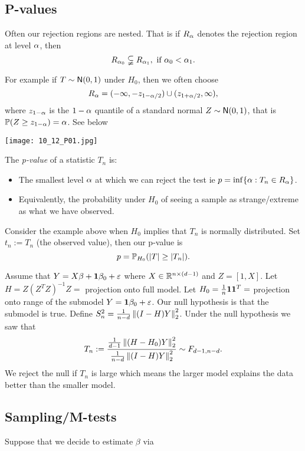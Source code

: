 \subsection{P-values}
Often our rejection regions are nested. That is if $R_{{\alpha}}$ denotes the rejection region at level ${\alpha}$, then 
\[R_{{\alpha}_0} \subsetneqq R_{{\alpha}_1}, \text{ if } {\alpha}_0 < {\alpha}_1. \]

For example if $T \sim {\mathsf{N}}(0,1)$ under $H_0$, then we often choose
\[R_{{\alpha}} = (-\infty, -z_{1-{\alpha}/2}) \cup (z_{1+{\alpha}/2},\infty),\]
where $z_{1-{\alpha}}$ is the $1-{\alpha}$ quantile of a standard normal $Z \sim {\mathsf{N}}(0,1)$, that is ${\mathbb{P}}(Z \ge z_{1-{\alpha}}) = {\alpha}$. See below
\begin{center}
    \texttt{[image: 10\_12\_P01.jpg]}
\end{center}

The \emph{p-value} of a statistic $T_n$ is:
\begin{itemize}
    \item The smallest level ${\alpha}$ at which we can reject the test ie $p = \inf\{{\alpha} : T_n \in R_{{\alpha}}\}$.
    \item Equivalently, the probability under $H_0$ of seeing a sample as strange/extreme as what we have observed.
\end{itemize}
\begin{ex}
Consider the example above when $H_0$ implies that $T_n$ is normally distributed. Set $t_n := T_n$ (the observed value), then our p-value is 
\[p = {\mathbb{P}}_{H_0}({\left\lvert T\right\rvert} \ge {\left\lvert T_n\right\rvert}). \]
\end{ex}
\begin{ex}
    Assume that $Y = X\beta + {{\bf 1}} \beta_0 + \varepsilon$ where $X \in {\mathbb R}^{n \times (d-1)}$ and $Z = [1, X]$. Let $H = Z(Z^TZ)^{-1}Z = $ projection onto full model. Let $H_0 = \frac{1}{n}{{\bf 1}} {{\bf 1}}^T = $ projection onto range of the submodel $Y = {{\bf 1}} \beta_0 + \varepsilon$. Our null hypothesis is that the submodel is true. Define $S_n^2 = \frac{1}{n-d}\left\|(I-H)Y\right\|_2^2$. Under the null hypothesis we saw that
    \[T_n := \frac{\frac{1}{d-1}\left\|(H-H_0)Y\right\|_2^2}{\frac{1}{n-d}\left\|(I-H)Y\right\|_2^2} \sim F_{d-1, n-d}. \]
    We reject the null if $T_n$ is large which means the larger model explains the data better than the smaller model.
\end{ex}
\subsection{Sampling/M-tests}
Suppose that we decide to estimate $\beta$ via 

